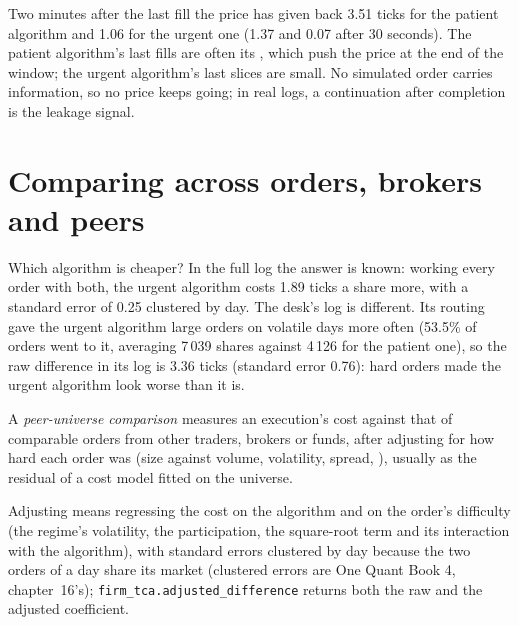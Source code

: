 Two minutes after the last fill the price has given back 3.51 ticks for the patient algorithm and 1.06 for the urgent one (1.37 and 0.07 after 30
seconds). The patient algorithm's last fills are often its , which push the price at the end of the window; the urgent algorithm's last
slices are small. No simulated order carries information, so no price keeps going; in real logs, a continuation after completion is the leakage signal.

\section{Comparing across orders, brokers and peers}

Which algorithm is cheaper? In the full log the answer is known: working every order with both, the urgent algorithm costs 1.89 ticks a share more,
with a standard error of 0.25 clustered by day. The desk's log is different. Its routing gave the urgent algorithm large orders on volatile days more
often (53.5\% of orders went to it, averaging 7\,039 shares against 4\,126 for the patient one), so the raw difference in its log is 3.36 ticks
(standard error 0.76): hard orders made the urgent algorithm look worse than it is.

\begin{definition}\label{def:mx:transaction-cost-analysis:peer}
A \emph{peer-universe comparison} measures an execution's cost against that of comparable orders from other traders,
brokers or funds, after adjusting for how hard each order was (size against volume, volatility, spread, ), usually as the residual of a cost
model fitted on the universe.
\end{definition}

Adjusting means regressing the cost on the algorithm and on the order's difficulty (the regime's volatility, the participation, the square-root
term and its interaction with the algorithm), with standard errors clustered by day because the two orders of a day share its market (clustered errors are One Quant Book 4,
chapter~16's); \texttt{firm\_tca.adjusted\_difference} returns both the raw and the adjusted coefficient.

\label{lst:mx:transaction-cost-analysis:assigned}

